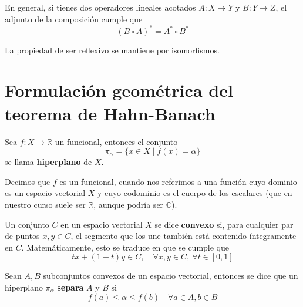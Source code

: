 \documentclass[12pt]{book}
\begin{document}
\begin{prop}
    En general, si tienes dos operadores lineales acotados $A: X \to Y$ y $B: Y \to Z$, el adjunto de la composición cumple que
    $$(B \circ A)^* = A^* \circ B^*$$
\end{prop}

\begin{prop}
    La propiedad de ser reflexivo se mantiene por isomorfismos.
\end{prop}

\section{Formulación geométrica del teorema de Hahn-Banach}

\begin{definicion}
    Sea $f: X \to \mathbb{R}$ un funcional, entonces el conjunto 
    \begin{equation*}
        \pi_\alpha = \{ x \in X \mid f(x) = \alpha \}
    \end{equation*}
    se llama \textbf{hiperplano} de $X$.
\end{definicion}

\begin{observacion}
    Decimos que $f$ es un funcional, cuando nos referimos a una función cuyo dominio es un espacio vectorial $X$ y cuyo codominio es el cuerpo de los escalares (que en nuestro curso suele ser $\mathbb{R}$, aunque podría ser $\mathbb{C}$). 
\end{observacion}

\begin{definicion}
    Un conjunto $C$ en un espacio vectorial $X$ se dice \textbf{convexo} si, para cualquier par de puntos $x, y \in C$, el segmento que los une también está contenido íntegramente en $C$.  Matemáticamente, esto se traduce en que se cumple que
    \begin{equation*}
        tx + (1-t)y \in C, \quad \forall x, y \in C, \ \forall t \in [0, 1]
    \end{equation*}
    
\end{definicion}

\begin{definicion}
    Sean $A,B$ subconjuntos convexos de un espacio vectorial, entonces se dice que un hiperplano $\pi_\alpha$ \textbf{separa} $A$ y $B$ si
    \begin{equation*}
        f(a) \leq \alpha \leq f(b) \quad \forall a \in A, b \in B
    \end{equation*}
\end{definicion}
\end{document}
